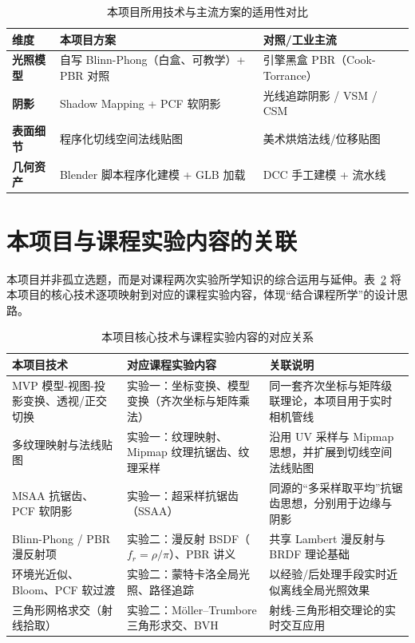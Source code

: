 \documentclass[11pt, a4paper, oneside]{report}
\begin{document}
\begin{table}[htbp]
\centering
\caption{本项目所用技术与主流方案的适用性对比}
\label{tab:compare}
\begin{tabular}{p{3cm}|p{5.5cm}|p{5.5cm}}
\hline
\textbf{维度} & \textbf{本项目方案} & \textbf{对照/工业主流} \\ \hline
\textbf{光照模型} & 自写 Blinn-Phong（白盒、可教学）+ PBR 对照 & 引擎黑盒 PBR（Cook-Torrance） \\ \hline
\textbf{阴影} & Shadow Mapping + PCF 软阴影 & 光线追踪阴影 / VSM / CSM \\ \hline
\textbf{表面细节} & 程序化切线空间法线贴图 & 美术烘焙法线/位移贴图 \\ \hline
\textbf{几何资产} & Blender 脚本程序化建模 + GLB 加载 & DCC 手工建模 + 流水线 \\ \hline
\end{tabular}
\end{table}

\section{本项目与课程实验内容的关联}
本项目并非孤立选题，而是对课程两次实验所学知识的综合运用与延伸。表~\ref{tab:course} 将本项目的核心技术逐项映射到对应的课程实验内容，体现“结合课程所学”的设计思路。

\begin{table}[htbp]
\centering
\caption{本项目核心技术与课程实验内容的对应关系}
\label{tab:course}
\begin{tabular}{p{4cm}|p{4.2cm}|p{4.2cm}}
\hline
\textbf{本项目技术} & \textbf{对应课程实验内容} & \textbf{关联说明} \\ \hline
MVP 模型-视图-投影变换、透视/正交切换 & 实验一：坐标变换、模型变换（齐次坐标与矩阵乘法） & 同一套齐次坐标与矩阵级联理论，本项目用于实时相机管线 \\ \hline
多纹理映射与法线贴图 & 实验一：纹理映射、Mipmap 纹理抗锯齿、纹理采样 & 沿用 UV 采样与 Mipmap 思想，并扩展到切线空间法线贴图 \\ \hline
MSAA 抗锯齿、PCF 软阴影 & 实验一：超采样抗锯齿（SSAA） & 同源的“多采样取平均”抗锯齿思想，分别用于边缘与阴影 \\ \hline
Blinn-Phong / PBR 漫反射项 & 实验二：漫反射 BSDF（$f_r=\rho/\pi$）、PBR 讲义 & 共享 Lambert 漫反射与 BRDF 理论基础 \\ \hline
环境光近似、Bloom、PCF 软过渡 & 实验二：蒙特卡洛全局光照、路径追踪 & 以经验/后处理手段实时近似离线全局光照效果 \\ \hline
三角形网格求交（射线拾取） & 实验二：Möller--Trumbore 三角形求交、BVH & 射线-三角形相交理论的实时交互应用 \\ \hline
\end{tabular}
\end{table}
\end{document}
